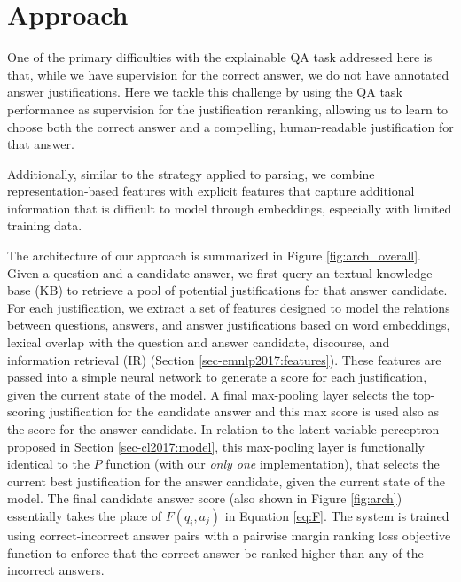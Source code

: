 \section{Approach}
\label{sec-emnlp2017:approach}
One of the primary difficulties with the explainable QA task addressed here is that, while we have supervision for the correct answer, we do not have annotated answer justifications.  
Here we tackle this challenge by using the QA task performance as supervision for the justification reranking, allowing us to 
learn to choose both the correct answer and a compelling, human-readable justification for that answer.

Additionally, similar to the strategy \citet{chen2014fast} applied to parsing, we combine representation-based features with explicit features that capture additional information that is difficult to model through embeddings, especially with limited training data.


The architecture of our approach is summarized in Figure \ref{fig:arch_overall}.  
Given a question and a candidate answer, we first query an textual knowledge base (KB) to retrieve a pool of potential justifications for that answer candidate.  
For each justification, we extract a set of features designed to model the relations between questions, answers, and answer justifications based on word embeddings, lexical overlap with the question and answer candidate, discourse, and information retrieval (IR) (Section \ref{sec-emnlp2017:features}).
These features are passed into a simple neural network to generate a score for each justification, given the current state of the model.  A final max-pooling layer selects the top-scoring justification for the candidate answer and this max score is used also as the score for the answer candidate.  In relation to the latent variable perceptron proposed in Section \ref{sec-cl2017:model}, this max-pooling layer is functionally identical to the $P$ function (with our \textit{only one} implementation), that selects the current best justification for the answer candidate, given the current state of the model.  The final candidate answer score (also shown in Figure \ref{fig:arch}) essentially takes the place of $F(q_i, a_j)$ in Equation \ref{eq:F}.     
The system is trained using correct-incorrect answer pairs with a pairwise margin ranking loss objective function to enforce that the correct answer be ranked higher than any of the incorrect answers. 

